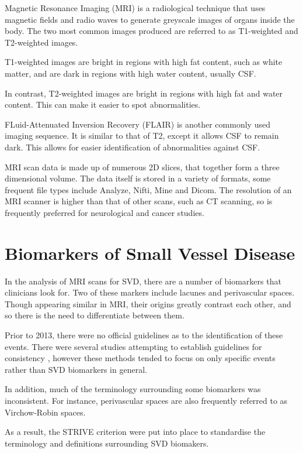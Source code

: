 \documentclass[honours,12pt]{unswthesis}
\numberwithin{equation}{section}
\begin{document}
Magnetic Resonance Imaging (MRI) is a radiological technique that uses magnetic fields and radio waves to generate greyscale images of organs inside the body. The two most common images produced are referred to as T1-weighted and T2-weighted images.

T1-weighted images are bright in regions with high fat content, such as white matter, and are dark in regions with high water content, usually CSF.

In contrast, T2-weighted images are bright in regions with high fat and water content. This can make it easier to spot abnormalities.

FLuid-Attenuated Inversion Recovery (FLAIR) is another commonly used imaging sequence. It is similar to that of T2, except it allows CSF to remain dark. This allows for easier identification of abnormalities against CSF.


MRI scan data is made up of numerous 2D slices, that together form a three dimensional volume. The data itself is stored in a variety of formats, some frequent file types include Analyze, Nifti, Mine and Dicom. The resolution of an MRI scanner is higher than that of other scans, such as CT scanning, so is frequently preferred for neurological and cancer studies.

\section{Biomarkers of Small Vessel Disease}\label{svd-markers}

In the analysis of MRI scans for SVD, there are a number of biomarkers that clinicians look for. Two of these markers include lacunes and perivascular spaces. Though appearing similar in MRI, their origins greatly contrast each other, and so there is the need to differentiate between them.

Prior to 2013, there were no official guidelines as to the identification of these events. There were several studies attempting to establish guidelines for consistency \cite{PotterGillian2015CPSV, AdamsH.H.Hieab2013RMfD}, however these methods tended to focus on only specific events rather than SVD biomarkers in general.

In addition, much of the terminology surrounding some biomarkers was inconsistent. For instance, perivascular spaces are also frequently referred to as Virchow-Robin spaces.

As a result, the STRIVE criterion \cite{WardlawJ.M.2013Nsfr} were put into place to standardise the terminology and definitions surrounding SVD biomakers.
\end{document}
